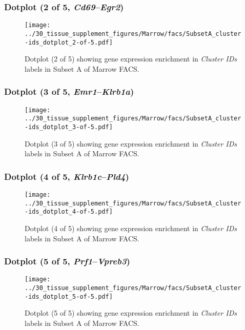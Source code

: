 \clearpage

\subsubsection{Dotplot (2 of 5, \emph{Cd69}--\emph{Egr2})}
\begin{figure}[h]
\centering
\texttt{[image: ../30\_tissue\_supplement\_figures/Marrow/facs/SubsetA\_cluster-ids\_dotplot\_2-of-5.pdf]}

\caption{ Dotplot (2 of 5)  showing gene expression enrichment in \emph{Cluster IDs} labels in Subset A of Marrow FACS. }
\end{figure}


\clearpage

\subsubsection{Dotplot (3 of 5, \emph{Emr1}--\emph{Klrb1a})}
\begin{figure}[h]
\centering
\texttt{[image: ../30\_tissue\_supplement\_figures/Marrow/facs/SubsetA\_cluster-ids\_dotplot\_3-of-5.pdf]}

\caption{ Dotplot (3 of 5)  showing gene expression enrichment in \emph{Cluster IDs} labels in Subset A of Marrow FACS. }
\end{figure}


\clearpage

\subsubsection{Dotplot (4 of 5, \emph{Klrb1c}--\emph{Pld4})}
\begin{figure}[h]
\centering
\texttt{[image: ../30\_tissue\_supplement\_figures/Marrow/facs/SubsetA\_cluster-ids\_dotplot\_4-of-5.pdf]}

\caption{ Dotplot (4 of 5)  showing gene expression enrichment in \emph{Cluster IDs} labels in Subset A of Marrow FACS. }
\end{figure}


\clearpage

\subsubsection{Dotplot (5 of 5, \emph{Prf1}--\emph{Vpreb3})}
\begin{figure}[h]
\centering
\texttt{[image: ../30\_tissue\_supplement\_figures/Marrow/facs/SubsetA\_cluster-ids\_dotplot\_5-of-5.pdf]}

\caption{ Dotplot (5 of 5)  showing gene expression enrichment in \emph{Cluster IDs} labels in Subset A of Marrow FACS. }
\end{figure}


